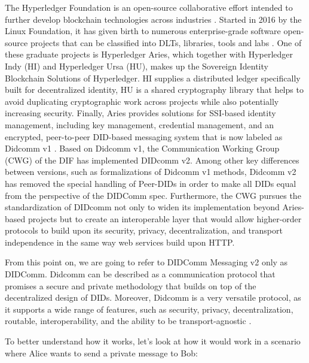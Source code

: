 The Hyperledger Foundation is an open-source collaborative effort intended to further develop blockchain technologies across industries \cite{jones_boswell_2022}. Started in 2016 by the Linux Foundation, it has given birth to numerous enterprise-grade software open-source projects that can be classified into DLTs, libraries, tools and labs \cite{lusard_lehors_muscara_boswell_zsigri_2021}. One of these graduate projects is Hyperledger Aries, which together with Hyperledger Indy (HI) and Hyperledger Ursa (HU), makes up the Sovereign Identity Blockchain Solutions of Hyperledger. HI supplies a distributed ledger specifically built for decentralized identity, HU is a shared cryptography library that helps to avoid duplicating cryptographic work across projects while also potentially increasing security. Finally, Aries provides solutions for SSI-based identity management, including key management, credential management, and an encrypted, peer-to-peer DID-based messaging system that is now labeled as Didcomm v1 \cite{jones_boswell_2022}. 
Based on Didcomm v1, the Communication Working Group (CWG) of the DIF has implemented DIDcomm v2. Among other key differences between versions, such as formalizations of Didcomm v1 methods, Didcomm v2 has removed the special handling of Peer-DIDs in order to make all DIDs equal from the perspective of the DIDComm spec. Furthermore, the CWG pursues the standardization of DIDcomm not only to widen its implementation beyond Aries-based projects but to create an interoperable layer that would allow higher-order protocols to build upon its security, privacy, decentralization, and transport independence in the same way web services build upon HTTP. \cite{young_2020} \cite{curren_looker_terbu_2020}

From this point on, we are going to refer to DIDComm Messaging v2 only as DIDComm. Didcomm can be described as a communication protocol that promises a secure and private methodology that builds on top of the decentralized design of DIDs. Moreover, Didcomm is a very versatile protocol, as it supports a wide range of features, such as security, privacy, decentralization, routable, interoperability, and the ability to be transport-agnostic \cite{curren_looker_terbu_2020}.

To better understand how it works, let's look at how it would work in a scenario where Alice wants to send a private message to Bob: 


